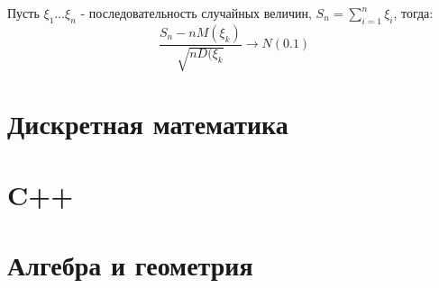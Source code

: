 Пусть $\xi_1 \dots \xi_n$ - последовательность случайных величин, $S_n = \sum_{i=1}^n \xi_i$, тогда:
\begin{equation}
	\frac{S_n-nM(\xi_k)}{\sqrt{nD(\xi_k}} \rightarrow N(0.1)
\end{equation}

\section{Дискретная математика}

\section{C++}
\section{Алгебра и геометрия}
